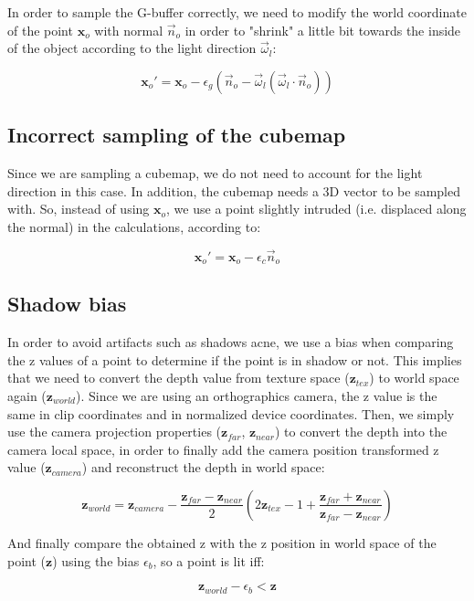 In order to sample the G-buffer correctly, we need to modify the world coordinate of the point $\mathbf{x}_o$ with normal $\vec{n}_o$ in order to "shrink" a little bit towards the inside of the object according to the light direction $\vec{\omega}_l$:

$$
\mathbf{x}_o' = \mathbf{x}_o - \epsilon_g (\vec{n}_o - \vec{\omega}_l ( \vec{\omega}_l \cdot  \vec{n}_o))
$$

\subsection{Incorrect sampling of the cubemap}

Since we are sampling a cubemap, we do not need to account for the light direction in this case. In addition, the cubemap needs a 3D vector to be sampled with. So, instead of using $\mathbf{x}_o$, we use a point slightly intruded (i.e. displaced along the normal) in the calculations, according to:

$$
\mathbf{x}_o' = \mathbf{x}_o - \epsilon_c \vec{n}_o
$$

\subsection{Shadow bias}

In order to avoid artifacts such as shadows acne, we use a bias when comparing the z values of a point to determine if the point is in shadow or not. This implies that we need to convert the depth value from texture space ($\mathbf{z}_{tex}$) to world space again ($\mathbf{z}_{world}$). Since we are using an orthographics camera, the z value is the same in clip coordinates and in normalized device coordinates. Then, we simply use the camera projection properties ($\mathbf{z}_{far}$, $\mathbf{z}_{near}$) to convert the depth into the camera local space, in order to finally add the camera position transformed z value ($\mathbf{z}_{camera}$) and reconstruct the depth in world space:

$$
\mathbf{z}_{world} = \mathbf{z}_{camera} - \frac{\mathbf{z}_{far} - \mathbf{z}_{near}}{2} \left( 2 \mathbf{z}_{tex} - 1 + \frac{\mathbf{z}_{far} + \mathbf{z}_{near}}{\mathbf{z}_{far} - \mathbf{z}_{near}}\right)
$$
		
And finally compare the obtained z with the z position in world space of the point ($\mathbf{z}$) using the bias $\epsilon_b$, so a point is lit iff:

$$
\mathbf{z}_{world} - \epsilon_b < \mathbf{z}
$$		

